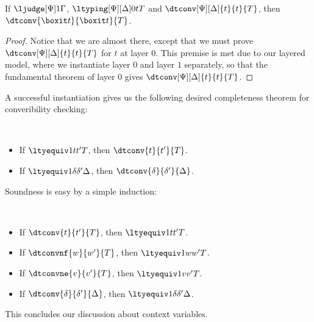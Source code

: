 \begin{lemma}
  If $\ljudge[\Psi] 1 \Gamma$, $\ltyping[\Psi][\Delta] 0 t {T}$ and $\dtconv[\Psi][\Delta]{t}{t}{T}$,
  then $\dtconv{\boxit t}{\boxit t}{T}$.
\end{lemma}
\begin{proof}
  Notice that we are almost there, except that we must prove
  $\dtconv[\Psi][\Delta]{t}{t}{T}$ for $t$ at layer $0$. %
  This premise is met due to our layered model, where we instantiate layer $0$ and
  layer $1$ separately, so that the fundamental theorem of layer $0$ gives
  $\dtconv[\Psi][\Delta]{t}{t}{T}$. 
\end{proof}

A successful instantiation gives us the following desired completeness theorem for
converibility checking:
\begin{theorem}[Completeness]$ $
  \begin{itemize}
  \item If $\ltyequiv 1 t {t'} T$, then $\dtconv{t}{t'}{T}$.
  \item If $\ltyequiv 1 \delta{\delta'}\Delta$, then $\dtconv{\delta}{\delta'}{\Delta}$. 
  \end{itemize}
\end{theorem}
Soundness is easy by a simple induction:
\begin{theorem}[Soundness]$ $
  \begin{itemize}
  \item If $\dtconv{t}{t'}{T}$, then $\ltyequiv 1 t {t'} T$.
  \item If $\dtconvnf{w}{w'}{T}$, then $\ltyequiv 1 w {w'} T$.
  \item If $\dtconvne{v}{v'}{T}$, then $\ltyequiv 1 v {v'} T$.
  \item If $\dtconv{\delta}{\delta'}{\Delta}$, then $\ltyequiv 1 \delta{\delta'}\Delta$.
  \end{itemize}
\end{theorem}
This concludes our discussion about context variables.
